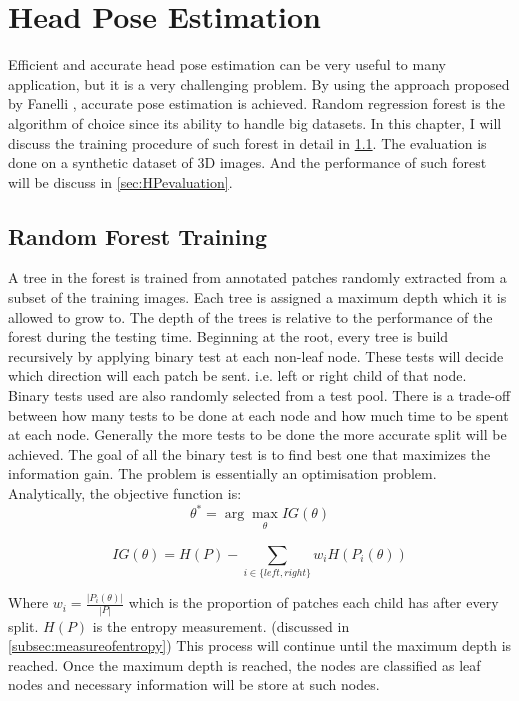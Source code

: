 \chapter{Head Pose Estimation}
\label{sec:HPestimation}
Efficient and accurate head pose estimation can be very useful to many application, but it is a very challenging problem. By using the approach proposed by Fanelli \cite{GFRF}, accurate pose estimation is achieved. Random regression forest is the algorithm of choice since its ability to handle big datasets. In this chapter, I will discuss the training procedure of such forest in detail in \ref{sec:RFtraining}. The evaluation is done on a synthetic dataset of 3D images. And the performance of such forest will be discuss in \ref{sec:HPevaluation}.


\clearpage
\section{Random Forest Training}
\label{sec:RFtraining}
A tree in the forest is trained from annotated patches randomly extracted from a subset of the training images. Each tree is assigned a maximum depth which it is allowed to grow to. The depth of the trees is relative to the performance of the forest during the testing time. Beginning at the root, every tree is build recursively by applying binary test at each non-leaf node. These tests will decide which direction will each patch be sent. i.e. left or right child of that node. Binary tests used are also randomly selected from a test pool. There is a trade-off between how many tests to be done at each node and how much time to be spent at each node. Generally the more tests to be done the more accurate split will be achieved. The goal of all the binary test is to find best one that maximizes the information gain. \cite{GFRF} The problem is essentially an optimisation problem. Analytically, the objective function is: 
\begin{equation}
\label{eq:argmax}
\theta ^* = \arg \max\limits_{\substack{ \theta}} IG(\theta)
\end{equation}

\begin{equation}
\label{eq:diffentropy}
IG(\theta) = H(P) - \sum\limits_{i \in \{ left,right \}} w_{i} H(P_{i}(\theta))
\end{equation}

Where $w_{i} =  \frac{|P_{i}(\theta)|}{|P|}$ which is the proportion of patches each child has after every split. $H(P)$ is the entropy measurement. (discussed in \ref{subsec:measureofentropy}) This process will continue until the maximum depth is reached. Once the maximum depth is reached, the nodes are classified as leaf nodes and necessary information will be store at such nodes.

